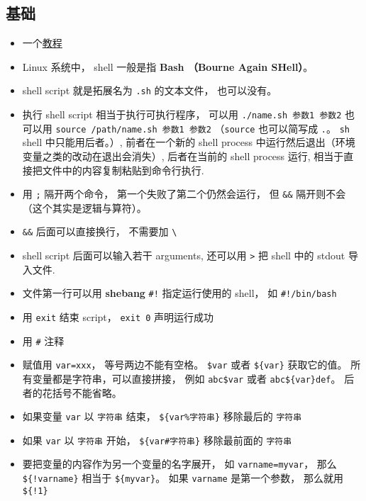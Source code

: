 
\begin{issues}
\issueDraft
\end{issues}


\subsection{基础}
\begin{itemize}
\item 一个\href{https://tldp.org/LDP/abs/html/why-shell.html}{教程}
\item Linux 系统中， shell 一般是指 \textbf{Bash （Bourne Again SHell）}。
\item shell script 就是拓展名为 \verb`.sh` 的文本文件， 也可以没有。
\item 执行 shell script 相当于执行可执行程序， 可以用 \verb`./name.sh 参数1 参数2` 也可以用 \verb`source /path/name.sh 参数1 参数2` （\verb|source| 也可以简写成 \verb|.|。 \verb|sh| shell 中只能用后者。）, 前者在一个新的 shell process 中运行然后退出（环境变量之类的改动在退出会消失）, 后者在当前的 shell process 运行, 相当于直接把文件中的内容复制粘贴到命令行执行.
\item 用 \verb|;| 隔开两个命令， 第一个失败了第二个仍然会运行， 但 \verb|&&| 隔开则不会（这个其实是逻辑与算符）。
\item \verb|&&| 后面可以直接换行， 不需要加 \verb|\|
\item shell script 后面可以输入若干 arguments, 还可以用 \verb`>` 把 shell 中的 stdout 导入文件.
\item 文件第一行可以用 \textbf{shebang} \verb`#!` 指定运行使用的 shell， 如 \verb`#!/bin/bash`
\item 用 \verb|exit| 结束 script， \verb`exit 0` 声明运行成功
\item 用 \verb`#` 注释
\item 赋值用 \verb`var=xxx`， 等号两边不能有空格。 \verb|$var| 或者 \verb|${var}| 获取它的值。 所有变量都是字符串，可以直接拼接， 例如 \verb|abc$var| 或者 \verb|abc${var}def|。 后者的花括号不能省略。
\item 如果变量 \verb|var| 以 \verb|字符串| 结束， \verb|${var%字符串}| 移除最后的 \verb|字符串|
\item 如果 \verb|var| 以 \verb|字符串| 开始， \verb|${var#字符串}| 移除最前面的 \verb|字符串|
\item 要把变量的内容作为另一个变量的名字展开， 如 \verb|varname=myvar|， 那么 \verb|${!varname}| 相当于 \verb|${myvar}|。 如果 \verb|varname| 是第一个参数， 那么就用 \verb|${!1}|

\end{itemize}
